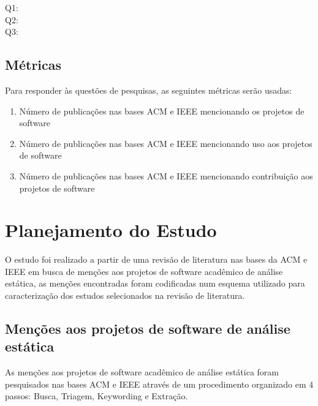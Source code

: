\begin{description}
  \item [Q1:] \EstudoDoisQuestaoUm
  \item [Q2:] \EstudoDoisQuestaoDois
  \item [Q3:] \EstudoDoisQuestaoTres
\end{description}

\subsection{Métricas}

Para responder às questões de pesquisas, as seguintes métricas serão usadas:

\begin{enumerate}
  \item Número de publicações nas bases ACM e IEEE mencionando os projetos de software
  \item Número de publicações nas bases ACM e IEEE mencionando uso aos projetos de software
  \item Número de publicações nas bases ACM e IEEE mencionando contribuição aos projetos de software
\end{enumerate}


\section{Planejamento do Estudo} \label{estudo2:planejamento} %

O estudo foi realizado a partir de uma revisão de literatura nas bases da ACM e
IEEE em busca de menções aos projetos de software acadêmico de análise
estática, as menções encontradas foram codificadas num esquema utilizado para
caracterização dos estudos selecionados na revisão de literatura.

\subsection{Menções aos projetos de software de análise estática}

As menções aos projetos de software acadêmico de análise estática foram pesquisados nas
bases ACM e IEEE através de um procedimento organizado em 4 passos: Busca,
Triagem, Keywording e Extração.

